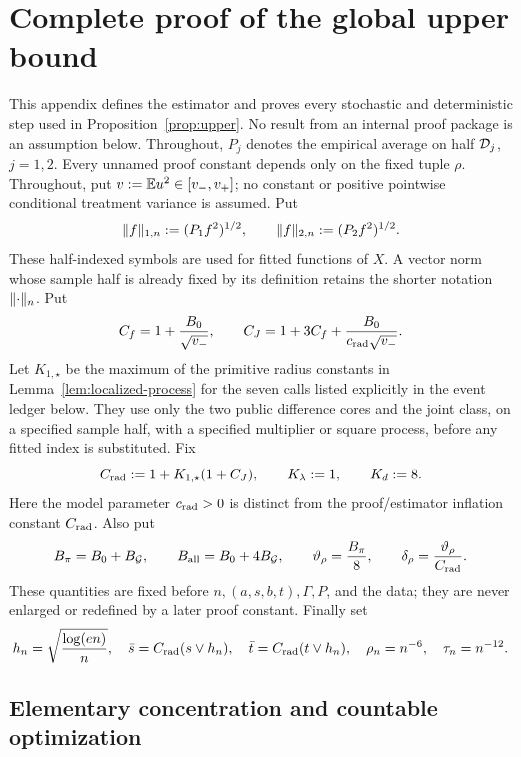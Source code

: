 \section{Complete proof of the global upper bound}
\label{app:upper}

This appendix defines the estimator and proves every stochastic and
deterministic step used in Proposition~\ref{prop:upper}.  No result from an
internal proof package is an assumption below.  Throughout, \(P_j\) denotes
the empirical average on half \(\mathcal D_j\), \(j=1,2\).  Every unnamed proof
constant depends only on the fixed tuple \(\rho\).  Throughout, put
\(v:=\mathbb E u^2\in[v_-,v_+]\); no constant or positive pointwise
conditional treatment variance is assumed.  Put
\[
 \lVert f\rVert_{1,n}:=(P_1f^2)^{1/2},\qquad
 \lVert f\rVert_{2,n}:=(P_2f^2)^{1/2}.
\]
These half-indexed symbols are used for fitted functions of \(X\).  A vector
norm whose sample half is already fixed by its definition retains the shorter
notation \(\lVert \cdot\rVert_n\).
Put
\[
 C_f=1+\frac{B_0}{\sqrt{v_-}},\qquad
 C_J=1+3C_f+\frac{B_0}{c_{\rm rad}\sqrt{v_-}}.
\]
Let \(K_{1,\star}\) be the maximum of the primitive radius constants in
Lemma~\ref{lem:localized-process} for the seven calls listed explicitly in
the event ledger below.  They use only the two public difference cores and
the joint class, on a specified sample half, with a specified multiplier or
square process, before any fitted index is substituted.  Fix
\[
 C_{\rm rad}:=1+K_{1,\star}(1+C_J),\qquad
 K_\lambda:=1,\qquad K_d:=8.
\]
Here the model parameter \(c_{\rm rad}>0\) is distinct from the
proof/estimator inflation constant \(C_{\rm rad}\).  Also put
\[
 B_\pi=B_0+B_{\mathcal G},\qquad
 B_{\rm all}=B_0+4B_{\mathcal G},\qquad
 \vartheta_\rho=\frac{B_\pi}{8},\qquad
 \delta_\rho=\frac{\vartheta_\rho}{C_{\rm rad}}.
\]
These quantities are fixed before \(n,(a,s,b,t),\Gamma,P\), and the data;
they are never enlarged or redefined by a later proof constant.  Finally set
\[
 h_n=\sqrt{\frac{\log(en)}n},\quad
 \bar s=C_{\rm rad}(s\vee h_n),\quad
 \bar t=C_{\rm rad}(t\vee h_n),\quad
 \rho_n=n^{-6},\quad \tau_n=n^{-12}.
\]

\subsection{Elementary concentration and countable optimization}

